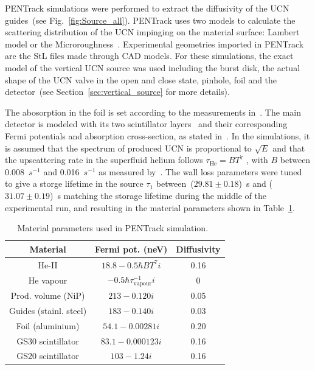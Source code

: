 PENTrack simulations were performed to extract the diffusivity of the
UCN guides~(see Fig.~\ref{fig:Source_all}). PENTrack uses two models
to calculate the scattering distribution of the UCN impinging on the
material surface: Lambert model or the
Microroughness~\cite{Steyerl1972}. Experimental geometries imported in
PENTrack are the StL files made through CAD models. For these
simulations, the exact model of the vertical UCN source was used
including the burst disk, the actual shape of the UCN valve in the
open and close state, pinhole, foil and the detector~(see
Section~\ref{sec:vertical_source} for more details).

The abosorption in the foil is set according to the measurements
in~\cite{atchison2009transmission}. The main detector is modeled with
its two scintillator layers~\cite{jamieson2017characterization} and
their corresponding Fermi potentials and absorption cross-section, as
stated in~\cite{Ban2016}. In the simulations, it is assumed that the
spectrum of produced UCN is proportional to $\sqrt{E}$ and that the
upscattering rate in the superfluid helium follows
$\tau_\mathrm{He} = B T^7$ , with $B$ between 0.008~$s^{-1}$ and
0.016~$s^{-1}$ as measured by~\cite{Leung2016}. The wall loss
parameters were tuned to give a storge lifetime in the source $\tau_1$
between~($29.81 \pm 0.18$)~s and ($31.07 \pm 0.19$)~s matching the
storage lifetime during the middle of the experimental run, and
resulting in the material parameters shown in
Table~\ref{tab:materials}.




\begin{table}
  \centering
\begin{tabular}{|c|c|c|}
  \hline
Material & Fermi pot. (neV) & Diffusivity \\
\hline
  He-II  & $18.8 - 0.5\hbar B T^7 i$ & 0.16 \\
  He vapour & $-0.5 \hbar \tau^{-1}_\mathrm{vapour} i$ & 0 \\
  Prod. volume (NiP) & $213 - 0.120 i$ & 0.05 \\
  Guides (stainl. steel) & $183 - 0.140 i$ & 0.03 \\
  Foil (aluminium) & $54.1 - 0.00281 i$ & 0.20 \\
  GS30 scintillator & $83.1 - 0.000123 i$ & 0.16 \\
  GS20 scintillator & $103 - 1.24 i$ & 0.16 \\
  \hline
\end{tabular}
\caption{Material parameters used in PENTrack
  simulation.~\cite{atchison2009transmission,Ban2016,sears1992neutron}}
\label{tab:materials}
\end{table}

